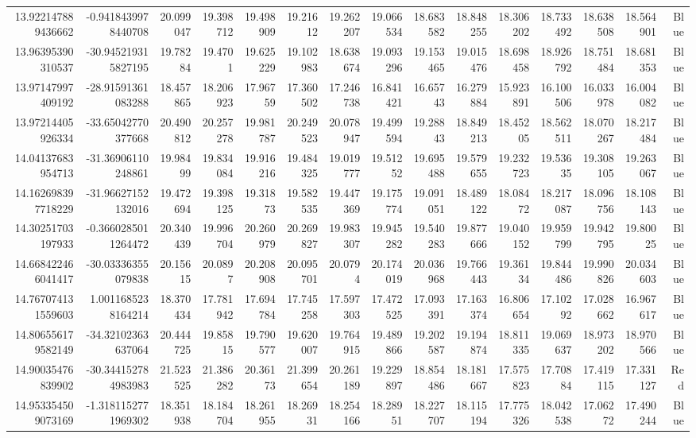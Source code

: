 \begin{center}
\begin{longtable}{rrrrrrrrrrrrrrr}
13.922147889436662 & -0.9418439978440708 & 20.099047 & 19.398712 & 19.498909 & 19.21612 & 19.262207 & 19.066534 & 18.683582 & 18.848255 & 18.306202 & 18.733492 & 18.638508 & 18.564901 & Blue \\
13.96395390310537 & -30.945219315827195 & 19.78284 & 19.4701 & 19.625229 & 19.102983 & 18.638674 & 19.093296 & 19.153465 & 19.015476 & 18.698458 & 18.926792 & 18.751484 & 18.681353 & Blue \\
13.97147997409192 & -28.91591361083288 & 18.457865 & 18.206923 & 17.96759 & 17.360502 & 17.246738 & 16.841421 & 16.65743 & 16.279884 & 15.923891 & 16.100506 & 16.033978 & 16.004082 & Blue \\
13.97214405926334 & -33.65042770377668 & 20.490812 & 20.257278 & 19.981787 & 20.249523 & 20.078947 & 19.499594 & 19.28843 & 18.849213 & 18.45205 & 18.562511 & 18.070267 & 18.217484 & Blue \\
14.04137683954713 & -31.36906110248861 & 19.98499 & 19.834084 & 19.916216 & 19.484325 & 19.019777 & 19.51252 & 19.695488 & 19.579655 & 19.232723 & 19.53635 & 19.308105 & 19.263067 & Blue \\
14.162698397718229 & -31.96627152132016 & 19.472694 & 19.398125 & 19.31873 & 19.582535 & 19.447369 & 19.175774 & 19.091051 & 18.489122 & 18.08472 & 18.217087 & 18.096756 & 18.108143 & Blue \\
14.30251703197933 & -0.3660285011264472 & 20.340439 & 19.996704 & 20.260979 & 20.269827 & 19.983307 & 19.945282 & 19.540283 & 19.877666 & 19.040152 & 19.959799 & 19.942795 & 19.80025 & Blue \\
14.668422466041417 & -30.03336355079838 & 20.15615 & 20.0897 & 20.208908 & 20.095701 & 20.0794 & 20.174019 & 20.036968 & 19.766443 & 19.36134 & 19.844486 & 19.990826 & 20.034603 & Blue \\
14.767074131559603 & 1.0011685238164214 & 18.370434 & 17.781942 & 17.694784 & 17.745258 & 17.597303 & 17.472525 & 17.093391 & 17.163374 & 16.806654 & 17.10292 & 17.028662 & 16.967617 & Blue \\
14.806556179582149 & -34.32102363637064 & 20.444725 & 19.85815 & 19.790577 & 19.620007 & 19.764915 & 19.489866 & 19.202587 & 19.194874 & 18.811335 & 19.069637 & 18.973202 & 18.970566 & Blue \\
14.90035476839902 & -30.344152784983983 & 21.523525 & 21.386282 & 20.36173 & 21.399654 & 20.261189 & 19.229897 & 18.854486 & 18.181667 & 17.575823 & 17.70884 & 17.419115 & 17.331127 & Red \\
14.953354509073169 & -1.3181152771969302 & 18.351938 & 18.184704 & 18.261955 & 18.26931 & 18.254166 & 18.28951 & 18.227707 & 18.115194 & 17.775326 & 18.042538 & 17.06272 & 17.490244 & Blue \\

\end{longtable}
\end{center}
